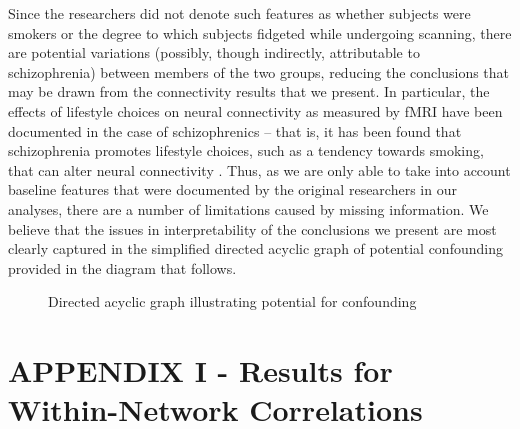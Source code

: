 \documentclass[11pt]{article}
\begin{document}
Since the researchers did not denote such features as whether subjects were smokers or the
degree to which subjects fidgeted while undergoing scanning, there are potential
variations (possibly, though indirectly, attributable to schizophrenia) between
members of the two groups, reducing the conclusions that may be drawn from the
connectivity results that we present. In particular, the effects of lifestyle
choices on neural connectivity as measured by fMRI have been documented in the
case of schizophrenics -- that is, it has been found that schizophrenia promotes
lifestyle choices, such as a tendency towards smoking, that can alter neural
connectivity \cite{leyba2008smoking}. Thus, as we are only able to take into 
account baseline features that were documented by the original researchers in 
our analyses, there are a number of limitations caused by missing information. 
We believe that the issues in interpretability of the conclusions we present 
are most clearly captured in the simplified directed acyclic graph of potential 
confounding provided in the diagram that follows. \\[14pt]

\begin{figure}[H]
\centering
{}
\caption{Directed acyclic graph illustrating potential for confounding}
\end{figure}



\newpage
\appendix

\section{APPENDIX I - Results for Within-Network Correlations}
\end{document}
